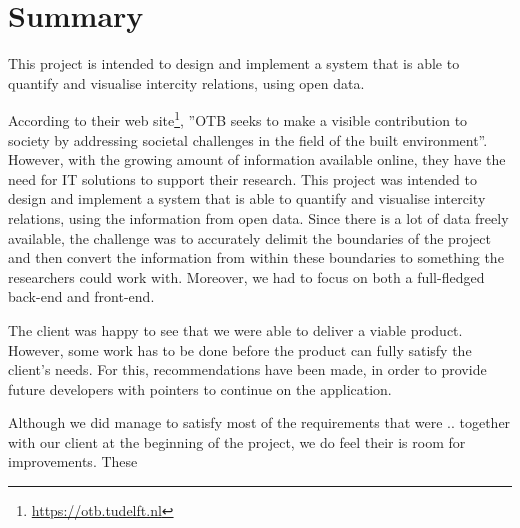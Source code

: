 \chapter*{Summary}

This project is intended to design and implement a system that is able to quantify and visualise intercity relations, using open data. 

According to their web site\footnote{\url{https://otb.tudelft.nl}}, ”OTB seeks to make a visible contribution to society by addressing societal challenges in the field of the built environment”. However, with the growing amount of information available online, they have the need for IT solutions to support their research. This project was intended to design and implement a system that is able to quantify and visualise intercity relations, using the information from open data. Since there is a lot of data freely available, the challenge was to accurately delimit the boundaries of the project and then convert the information from within these boundaries to something the researchers could work with. Moreover, we had to focus on both a full-fledged back-end and front-end. 



The client was happy to see that we were able to deliver a viable product. However, some work has to be done before the product can fully satisfy the client’s needs. For this, recommendations have been made, in order to provide future developers with pointers to continue on the application.






Although we did manage to satisfy most of the requirements that were .. together with our client at the beginning of the project, we do feel their is room for improvements. These 


